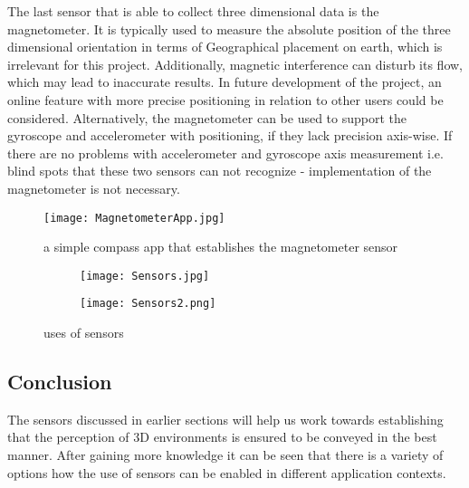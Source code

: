The last sensor that is able to collect three dimensional data is the magnetometer. It is typically used to measure the absolute position of the three dimensional orientation in terms of Geographical placement on earth, which is irrelevant for this project. Additionally, magnetic interference can disturb its flow, which may lead to inaccurate results. In future development of the project, an online feature with more precise positioning in relation to other users could be considered. Alternatively, the magnetometer can be used to support the gyroscope and accelerometer with positioning, if they lack precision axis-wise. If there are no problems with accelerometer and gyroscope axis measurement i.e. blind spots that these two sensors can not recognize - implementation of the magnetometer is not necessary. 

\begin{figure}[H]
\centering
\texttt{[image: MagnetometerApp.jpg]}
\caption{a simple compass app that establishes the magnetometer sensor}
\end{figure}

\begin{figure}[H]
\begin{subfigure}{.5\textwidth}
  \centering
  \texttt{[image: Sensors.jpg]}
\end{subfigure}%
\begin{subfigure}{.5\textwidth}
  \centering
  \texttt{[image: Sensors2.png]}
\end{subfigure}
\caption{uses of sensors}
\end{figure}


\subsection{Conclusion}
The sensors discussed in earlier sections will help us work towards establishing that the perception of 3D environments is ensured to be conveyed in the best manner. After gaining more knowledge it can be seen that there is a variety of options how the use of sensors can be enabled in different application contexts.